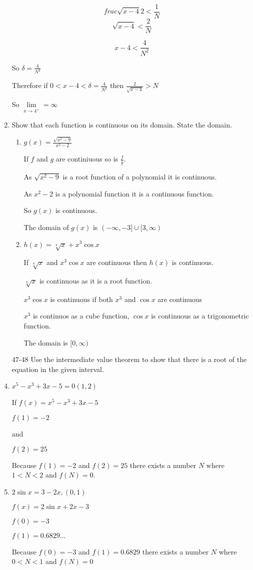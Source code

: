 \documentclass{article}
\begin{document}
\begin{enumerate}
			$$frac{\sqrt{x-4}}{2} < \frac{1}{N}$$
			$$\sqrt{x-4} < \frac{2}{N}$$

			$$x - 4 < \frac{4}{N^2}$$

			So $\delta = \frac{4}{N^2}$

			Therefore if $0 < x-4 < \delta = \frac{4}{N^2}$ then $\frac{2}{\sqrt{x-4}} > N$

			So $\lim \limits _{x \to 4^{+}} = \infty$


		\item Show that each function is continuous on its domain. State the domain.

			\begin{enumerate}
				\item $g(x) = \frac{\sqrt{x^2 - 9}}{x^2 - 2}$

					If $f$ and $g$ are continiuous so is $\frac{f}{g}$.

					As $\sqrt{x^2 - 9}$ is a root function of a polynomial it is continuous.

					As $x^2 - 2$ is a polynomial function it is a continuous function.

					So $g(x)$ is continuous.

					The domain of $g(x)$ is $(-\infty, -3] \cup [3, \infty)$

				\item $h(x) = \sqrt[4]{x} + x^3 \cos x$

					If $\sqrt[4]{x}$ and $x^3 \cos x$ are continuous then $h(x)$ is continuous.

					$\sqrt[4]{x}$ is continuous as it is a root function.

					$x^3 \cos x$ is continuous if both $x^3$ and $\cos x$ are continuous

					$x^3$ is continuos as a cube function, $\cos x$ is continuous as a trigonometric function.

					The domain is $[0, \infty)$
			\end{enumerate}

		\item[47-48] Use the intermediate value theorem to show that there is a root of the equation in the given
				interval.

			\item $x^5 - x^3 + 3x - 5 = 0 (1,2)$

			If $f(x) = x^5 - x^3 + 3x - 5$

			$f(1) = -2$

			and

			$f(2) = 25$

			Because $f(1) = -2$ and $f(2) = 25$ there exists a number $N$ where $1 < N < 2$ and $f(N) = 0$.

			\item $2 \sin x = 3 - 2x, (0,1)$

				$f(x) = 2 \sin x + 2x - 3$

				$f(0) = -3$

				$f(1) = 0.6829...$

			Because $f(0) = -3$ and $f(1) = 0.6829$ there exists a number $N$ where $0 < N < 1$ and $f(N) = 0$
			
	\end{enumerate}
\end{document}
